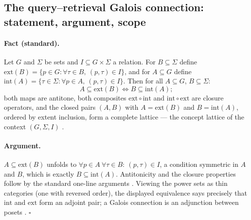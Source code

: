 \documentclass{article}
\begin{document}
\subsection{The query--retrieval Galois connection: statement, argument, scope}
\label{p1:app:galois}

\paragraph{Fact (standard).}
Let $G$ and $\Sigma$ be sets and $I \subseteq G \times \Sigma$ a relation. For $B \subseteq \Sigma$ define $\mathrm{ext}(B) = \{p \in G : \forall \tau \in B,\ (p,\tau) \in I\}$, and for $A \subseteq G$ define $\mathrm{int}(A) = \{\tau \in \Sigma : \forall p \in A,\ (p,\tau) \in I\}$. Then for all $A \subseteq G$, $B \subseteq \Sigma$:
\[
A \subseteq \mathrm{ext}(B) \iff B \subseteq \mathrm{int}(A);
\]
both maps are antitone, both composites $\mathrm{ext}\circ\mathrm{int}$ and $\mathrm{int}\circ\mathrm{ext}$ are closure operators, and the closed pairs $(A, B)$ with $A = \mathrm{ext}(B)$ and $B = \mathrm{int}(A)$, ordered by extent inclusion, form a complete lattice --- the concept lattice of the context $(G, \Sigma, I)$ \citep{ganter1999fca}.

\paragraph{Argument.}
$A \subseteq \mathrm{ext}(B)$ unfolds to $\forall p \in A\ \forall \tau \in B:\ (p,\tau) \in I$, a condition symmetric in $A$ and $B$, which is exactly $B \subseteq \mathrm{int}(A)$. Antitonicity and the closure properties follow by the standard one-line arguments \citep[Ch.~1]{ganter1999fca}. Viewing the power sets as thin categories (one with reversed order), the displayed equivalence says precisely that $\mathrm{int}$ and $\mathrm{ext}$ form an adjoint pair; a Galois connection is an adjunction between posets \citep[Ch.~IV]{maclane1998categories}. \hfill$\square$
\end{document}
